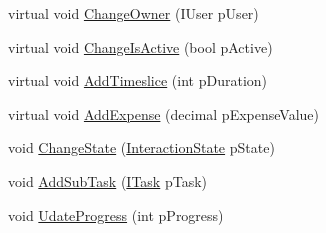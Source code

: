 \begin{DoxyCompactItemize}
virtual void \hyperlink{class_plex_byte_1_1_mo_cap_1_1_interactions_1_1_task_a47eac360e6cf4cd6b84f7445ee4a6a33}{Change\+Owner} (I\+User p\+User)
\item 
virtual void \hyperlink{class_plex_byte_1_1_mo_cap_1_1_interactions_1_1_task_ae0cb74071fbffd9fa7cd1dba842b6715}{Change\+Is\+Active} (bool p\+Active)
\item 
virtual void \hyperlink{class_plex_byte_1_1_mo_cap_1_1_interactions_1_1_task_ab8d71506e5343bc302bb661a5131449b}{Add\+Timeslice} (int p\+Duration)
\item 
virtual void \hyperlink{class_plex_byte_1_1_mo_cap_1_1_interactions_1_1_task_a12136bc5d5722e10c4a20b4e9ab40788}{Add\+Expense} (decimal p\+Expense\+Value)
\item 
void \hyperlink{class_plex_byte_1_1_mo_cap_1_1_interactions_1_1_task_a42cc4439fb4ab6d4e11f8764b217b46d}{Change\+State} (\hyperlink{namespace_plex_byte_1_1_mo_cap_1_1_interactions_afcb673d9186608b6bd3b187179aedc8a}{Interaction\+State} p\+State)
\item 
void \hyperlink{class_plex_byte_1_1_mo_cap_1_1_interactions_1_1_task_aa152325c4d018f68b8dcbe1ef4c46497}{Add\+Sub\+Task} (\hyperlink{interface_plex_byte_1_1_mo_cap_1_1_interactions_1_1_i_task}{I\+Task} p\+Task)
\item 
void \hyperlink{class_plex_byte_1_1_mo_cap_1_1_interactions_1_1_task_af28b4349816bcd4d60c0746e7b7425d4}{Udate\+Progress} (int p\+Progress)
\end{DoxyCompactItemize}
